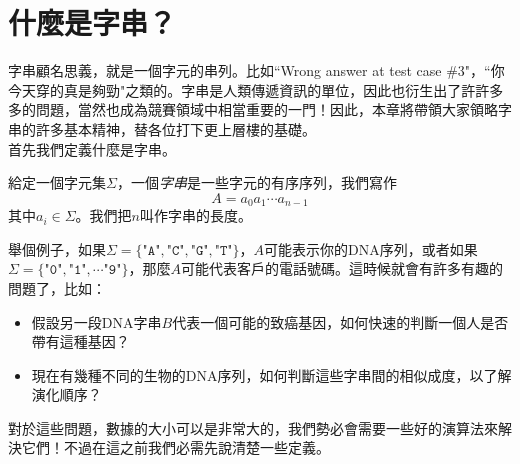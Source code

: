 \documentclass[a4paper,12pt]{book}
\begin{document}
\newcommand{\str}[1]{\texttt{"#1"}}
\newcommand{\mcstr}[2]{\texttt{"#1}\cdots\texttt{#2"}}
\newcommand{\ord}[1]{\opord\left(#1\right)}
\newcommand{\abs}[1]{\lvert #1 \rvert}
\newcommand{\floor}[1]{\lfloor #1 \rfloor}
\newcommand{\ceil}[1]{\lceil #1 \rceil}
\newcommand{\opord}{\operatorname{\mathcal{O}}}
\newcommand{\fail}{\operatorname{\mathcal{F}}}
\newcommand{\flk}{\operatorname{\mathfrak{F}}}
\newcommand{\suf}{\operatorname{\sigma}}
\newcommand{\rank}{\operatorname{\mathcal{R}}}
\newcommand{\sa}{\operatorname{\mathcal{SA}}}
\newcommand{\hei}{\operatorname{\mathcal{H}}}
\newcommand{\edps}{\operatorname{\mathcal{E}}}
\newcommand{\mx}{\operatorname{\mathcal{M}}}
\newcommand{\argmax}{\operatorname{arg\,max}}
\newcommand{\cons}[1]{\left[ \: #1 \: \right]}

\newcommand\numbereqn{\addtocounter{equation}{1}\tag{\theequation}}
\newcommand\listeqn{\hfill\refstepcounter{equation}(\theequation)}
\newenvironment{monobox}{\linespread{0.6}\Verbatim[frame=single, commandchars=\\\{\}]}{\endVerbatim}
\makeatletter


\begin{comment}
- 
- 凡走過必留下痕跡
- 字串中的規模經濟
- 雜湊的力量
- 統一場論
- 更多有趣的貓貓蟲
\end{comment}


\section{什麼是字串？}
字串顧名思義，就是一個字元的串列。比如``Wrong answer at test case \#3"，``你今天穿的真是夠勁"之類的。字串是人類傳遞資訊的單位，因此也衍生出了許許多多的問題，當然也成為競賽領域中相當重要的一門！因此，本章將帶領大家領略字串的許多基本精神，替各位打下更上層樓的基礎。 \\

首先我們定義什麼是字串。
\begin{theorem}[定義]
  給定一個字元集$\Sigma$，一個\emph{字串}是一些字元的有序序列，我們寫作
  \[ A = a_0 a_1 \cdots a_{n-1} \]
  其中$a_i \in \Sigma$。我們把$n$叫作字串的長度。
\end{theorem}
舉個例子，如果$\Sigma = \{\texttt{"A"}, \texttt{"C"}, \texttt{"G"}, \texttt{"T"}\}$，$A$可能表示你的DNA序列，或者如果$\Sigma = \{\texttt{"0"}, \texttt{"1"}, \cdots \texttt{"9"}\}$，那麼$A$可能代表客戶的電話號碼。這時候就會有許多有趣的問題了，比如：
\begin{itemize}
  \item 假設另一段DNA字串$B$代表一個可能的致癌基因，如何快速的判斷一個人是否帶有這種基因？
  \item 現在有幾種不同的生物的DNA序列，如何判斷這些字串間的相似成度，以了解演化順序？
\end{itemize}
對於這些問題，數據的大小可以是非常大的，我們勢必會需要一些好的演算法來解決它們！不過在這之前我們必需先說清楚一些定義。
\end{document}

